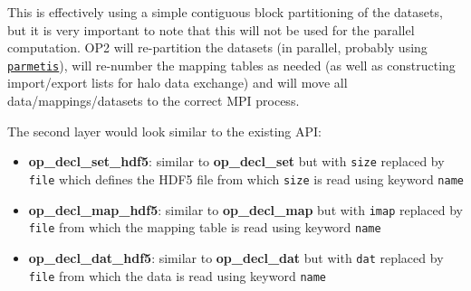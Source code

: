 \documentclass[11pt]{article}
\begin{document}
This is effectively using a simple contiguous block partitioning of the datasets, 
but it is very important to note that this will not be used for the parallel 
computation.  OP2 will re-partition the datasets (in parallel, probably using 
\href{http://glaros.dtc.umn.edu/gkhome/metis/parmetis/overview}{\tt parmetis}), 
will re-number the mapping tables as needed (as well as constructing import/export 
lists for halo data exchange) and will move all data/mappings/datasets to the 
correct MPI process.

The second layer would look similar to the existing API:
\begin{itemize}
\item {\bf op\_decl\_set\_hdf5}: similar to {\bf op\_decl\_set} but with {\tt size} 
replaced by {\tt file} which defines the HDF5 file from which {\tt size} 
is read using keyword {\tt name}

\item {\bf op\_decl\_map\_hdf5}: similar to {\bf op\_decl\_map} but with {\tt imap} 
replaced by {\tt file} from which the mapping table is read using keyword {\tt name}

\item {\bf op\_decl\_dat\_hdf5}: similar to {\bf op\_decl\_dat} but with {\tt dat} 
replaced by {\tt file} from which the data is read using keyword {\tt name}
\end{itemize}
\end{document}
